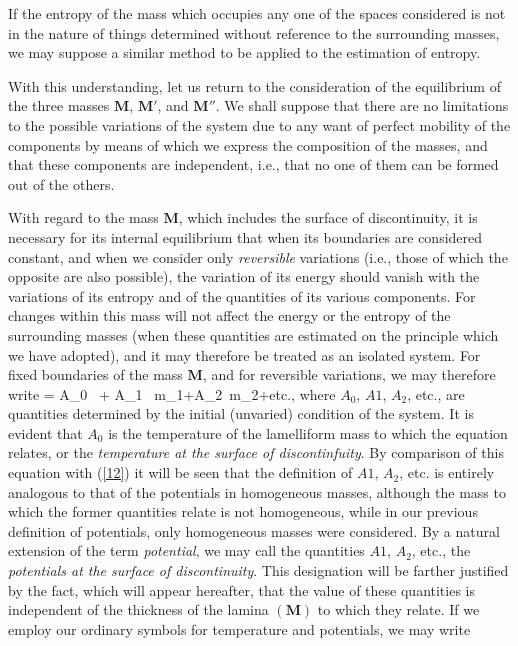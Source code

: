 \documentclass[12pt]{article}
\begin{document}
{If the entropy of the mass which occupies any one of the spaces considered is not in the nature of things determined without reference to the surrounding masses, we may suppose a similar method to be applied to the estimation of entropy.


With this understanding, let us return to the consideration of the equilibrium of the three masses $\mathbf{M}$, $\mathbf{M}'$, and $\mathbf{M}''$. We shall suppose that there are no limitations to the possible variations of the system due to any want of perfect mobility of the components by means of which we express the composition of the masses, and that these components are independent, i.e., that no one of them can be formed out of the others.


With regard to the mass $\mathbf{M}$, which includes the surface of discontinuity, it is necessary for its internal equilibrium that when its boundaries are considered constant, and when we consider only \textit{reversible} variations (i.e., those of which the opposite are also possible), the variation of its energy should vanish with the variations of its entropy and of the quantities of its various components. For changes within this mass will not affect the energy or the entropy of the surrounding masses (when these quantities are estimated on the principle which we have adopted), and it may therefore be treated as an isolated system. For fixed boundaries of the mass $\mathbf{M}$, and for reversible variations, we may therefore write
\eqs  \delta \epsilon= A_0 \, \delta \eta + A_1 \, \delta m_1+A_2\, \delta m_2+etc., \label{476} \eqe
where $A_0$, $A1$, $A_2$, etc., are quantities determined by the initial (unvaried) condition of the system. It is evident that $A_0$ is the temperature of the lamelliform mass to which the equation relates, or the \textit{temperature at the surface of discontinfuity}. By comparison of this equation with (\ref{12}) it will be seen that the definition of $A1$, $A_2$, etc. is entirely analogous to that of the potentials in homogeneous masses, although the mass to which the former quantities relate is not homogeneous, while in our previous definition of potentials, only homogeneous masses were considered. By a natural extension of the term \textit{potential}, we may call the quantities $A1$, $A_2$, etc., the \textit{potentials at the surface of discontinuity}. This designation will be farther justified by the fact, which will appear hereafter, that the value of these quantities is independent of the thickness of the lamina $(\mathbf{M})$ to which they relate. If we employ our ordinary symbols for temperature and potentials, we may write
}
\end{document}
